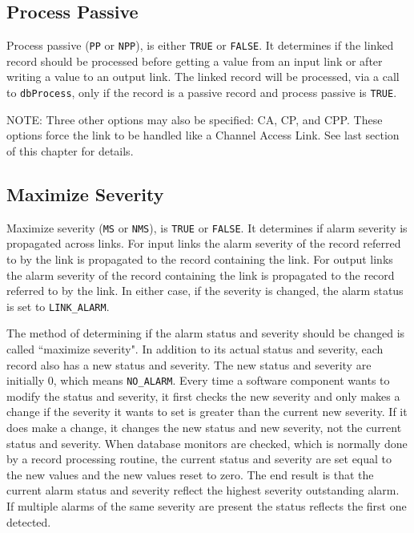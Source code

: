 \subsection{Process Passive}

Process passive (\verb|PP| or \verb|NPP|), is either \verb|TRUE| or \verb|FALSE|.  It determines if the linked record should be processed before 
getting a value from an input link or after writing a value to an output link. The linked record will be processed, via a call 
to \verb|dbProcess|, only if the record is a passive record and process passive is \verb|TRUE|.

NOTE: Three other options may also be specified: CA, CP, and CPP. These options force the link to be handled like a 
Channel Access Link. See last section of this chapter for details.

\subsection{Maximize Severity}

Maximize severity (\verb|MS| or \verb|NMS|), is \verb|TRUE| or \verb|FALSE|.  It determines if alarm severity is propagated across links. For input 
links the alarm severity of the record referred to by the link is propagated to the record containing the link. For output 
links the alarm severity of the record containing the link is propagated to the record referred to by the link. In either case, 
if the severity is changed, the alarm status is set to \verb|LINK_ALARM|.

The method of determining if the alarm status and severity should be changed is called ``maximize severity". In addition 
to its actual status and severity, each record also has a new status and severity. The new status and severity are initially 0, 
which means \verb|NO_ALARM|. Every time a software component wants to modify the status and severity, it first checks the 
new severity and only makes a change if the severity it wants to set is greater than the current new severity. If it does make 
a change, it changes the new status and new severity, not the current status and severity. When database monitors are 
checked, which is normally done by a record processing routine, the current status and severity are set equal to the new 
values and the new values reset to zero. The end result is that the current alarm status and severity reflect the highest 
severity outstanding alarm. If multiple alarms of the same severity are present the status reflects the first one detected.

